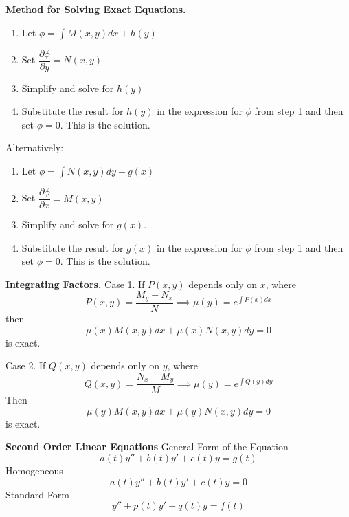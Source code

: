 \documentclass[../main.tex]{subfiles}
\begin{document}
    \textbf{Method for Solving Exact Equations. }

    \begin{enumerate}
        \item Let $\phi=\int M(x,y)dx + h(y)$
        \item Set $\dfrac{\partial \phi}{\partial y} = N(x,y)$
        \item Simplify and solve for $h(y)$
        \item  Substitute the result for $h(y)$ in the expression for $\phi$ from step 1 and then set $\phi=0$. This is the solution. 
    \end{enumerate}
    
    Alternatively: 
    \begin{enumerate}
        \item Let $\phi=\int N(x,y)dy + g(x)$
        \item Set $\dfrac{\partial \phi}{\partial x} = M(x,y)$
        \item Simplify and solve for $g(x)$. 
        \item Substitute the result for $g(x)$ in the expression for $\phi$ from step 1 and then set $\phi=0$. This is the solution. 
    \end{enumerate}
    
    \textbf{Integrating Factors.} Case 1. If $P(x,y)$ depends only on $x$, where
    \begin{equation*}
    P(x,y)=\dfrac{M_y-N_x}{N} \implies \mu(y) = e^{\int P(x)dx}
    \end{equation*}
    then
    \begin{equation*}
    \mu(x) M(x,y) dx + \mu(x) N(x,y) dy = 0
    \end{equation*}
    is exact.
    
    Case 2. If $Q(x,y)$ depends only on $y$, where
    \begin{equation*}
    Q(x,y)=\dfrac{N_x-M_y}{M} \implies \mu(y) = e^{\int Q(y)dy}
    \end{equation*}
    Then 
    \begin{equation*}
    \mu(y) M(x,y) dx + \mu(y)N(x,y) dy =0
    \end{equation*}
    is exact.
    
\textbf{Second Order Linear Equations} General Form of the Equation
    \begin{equation} 
    a(t)y''+b(t)y'+c(t)y=g(t) \label{eq:general}
    \end{equation}
Homogeneous
\begin{equation}
    a(t)y''+b(t)y'+c(t)y=0\label{eq:homog}
\end{equation}
Standard Form
\begin{equation}
     y''+p(t)y'+q(t)y=f(t) \label{eq:ODE}
\end{equation}
\end{document}
